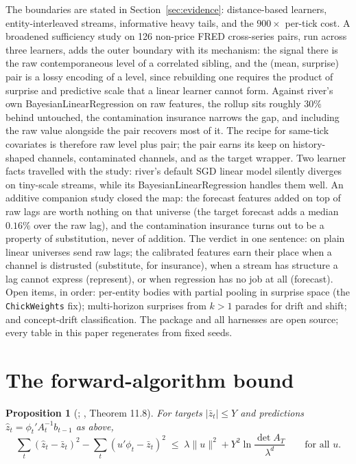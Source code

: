 \documentclass[article]{jss}
\providecommand{\code}[1]{\texttt{#1}}
\newtheorem{proposition}{Proposition}
\theoremstyle{remark}
\begin{document}
The boundaries are stated in Section~\ref{sec:evidence}: distance-based
learners, entity-interleaved streams, informative heavy tails, and the
$900\times$ per-tick cost. A broadened sufficiency study on 126 non-price
FRED cross-series pairs, run across three learners, adds the outer boundary
with its mechanism: the signal there is the raw contemporaneous level of a
correlated sibling, and the (mean, surprise) pair is a lossy encoding of a
level, since rebuilding one requires the product of surprise and predictive
scale that a linear learner cannot form. Against river's own
BayesianLinearRegression on raw features, the rollup sits roughly $30\%$
behind untouched, the contamination insurance narrows the gap, and including
the raw value alongside the pair recovers most of it. The recipe for
same-tick covariates is therefore raw level plus pair; the pair earns its
keep on history-shaped channels, contaminated channels, and as the target
wrapper. Two learner facts travelled with the study: river's default SGD
linear model silently diverges on tiny-scale streams, while its
BayesianLinearRegression handles them well. An additive companion study
closed the map: the forecast features added on top of raw lags are worth
nothing on that universe (the target forecast adds a median $0.16\%$ over
the raw lag), and the contamination insurance turns out to be a property of
substitution, never of addition. The verdict in one sentence: on plain
linear universes send raw lags; the calibrated features earn their place
when a channel is distrusted (substitute, for insurance), when a stream has
structure a lag cannot express (represent), or when regression has no job
at all (forecast). Open items, in order: per-entity bodies with
partial pooling in surprise space (the \code{ChickWeights} fix);
multi-horizon surprises from $k > 1$ parades for drift and shift; and
concept-drift classification. The package and all harnesses are open source;
every table in this paper regenerates from fixed seeds.

\appendix

\section{The forward-algorithm bound} \label{app:vaw}

\begin{proposition}[\citealp{vovk2001,azoury2001}; \citealp{cesabianchi2006},
Theorem 11.8]
For targets $|\bar z_t| \le Y$ and predictions $\hat z_t = \phi_t' A_t^{-1}
b_{t-1}$ as above,
\[
\sum_t (\hat z_t - \bar z_t)^2 - \sum_t (u'\phi_t - \bar z_t)^2 \;\le\;
\lambda\|u\|^2 + Y^2 \ln \frac{\det A_T}{\lambda^d} \qquad \text{for all } u.
\]
\end{proposition}
\end{document}
